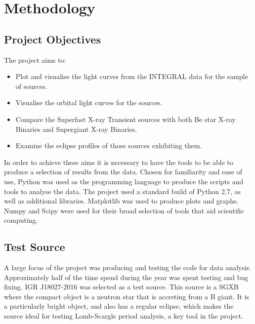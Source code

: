 
\chapter{Methodology} %

\label{ch:method} %

\section{Project Objectives}
The project aims to:
\begin{itemize}
\item Plot and visualise the light curves from the INTEGRAL data for the sample of sources.
\item Visualise the orbital light curves for the sources.
\item Compare the Superfast X-ray Transient sources with both Be star X-ray Binaries and Supergiant X-ray Binaries. 
\item Examine the eclipse profiles of those sources exhibiting them.
\end{itemize}
In order to achieve these aims it is necessary to have the tools to be able to produce a selection of results from the data. Chosen for familiarity and ease of use, Python was used as the programming language to produce the scripts and tools to analyse the data. The project used a standard build of Python 2.7, as well as additional libraries. Matplotlib was used to produce plots and graphs. Numpy and Scipy were used for their broad selection of tools that aid scientific computing.

\section{Test Source}
A large focus of the project was producing and testing the code for data analysis. Approximately half of the time spend during the year was spent testing and bug fixing. IGR J18027-2016 was selected as a test source. This source is a SGXB where the compact object is a neutron star that is accreting from a B giant\cite{simbad,Mason}. It is a particularly bright object, and also has a regular eclipse, which makes the source ideal for testing Lomb-Scargle period analysis, a key tool in the project. 

